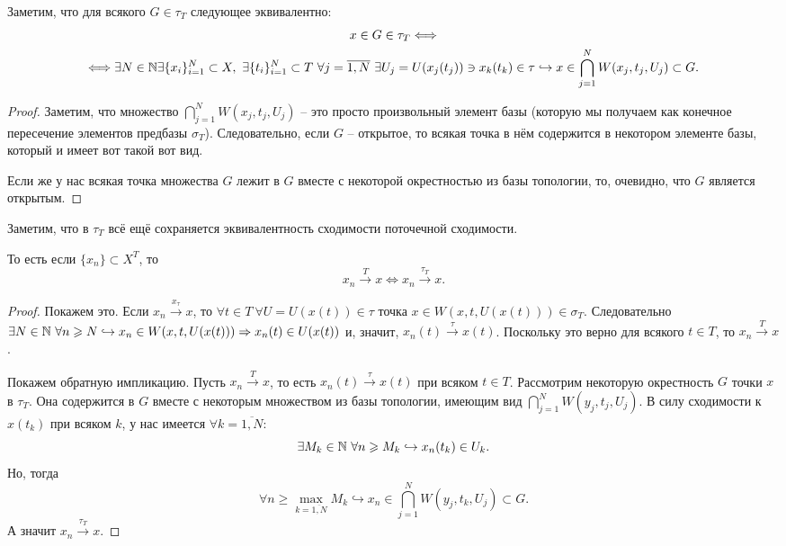 \begin{proposition}
    Заметим, что для всякого $G \in \tau_T$ следующее эквивалентно:
    \begin{multline*}
        x \in G \in \tau_T \Longleftrightarrow \\
        \Longleftrightarrow \exists N \in \mathbb{N} \exists \{x_i\}_{i = 1}^{N} \subset X, \ \exists \{t_i\}_{i = 1}^{N} \subset T \ \forall j = \overline{1, N} \ \exists U_j = U(x_j(t_j)) \ni x_k(t_k) \in \tau \hookrightarrow x \in \bigcap_{j = 1}^{N} W(x_j, t_j, U_j) \subset G.
    \end{multline*}
\end{proposition}
\begin{proof}
    Заметим, что множество $\bigcap_{j = 1}^{N} W(x_j, t_j, U_j)$ -- это просто произвольный элемент базы (которую мы получаем как конечное пересечение элементов предбазы $\sigma_T$).
    Следовательно, если $G$ -- открытое, то всякая точка в нём содержится в некотором элементе базы, который и имеет вот такой вот вид.

    Если же у нас всякая точка множества $G$ лежит в $G$ вместе с некоторой окрестностью из базы топологии, то, очевидно, что $G$ является открытым.
\end{proof}
\begin{note}
    Заметим, что в $\tau_T$ всё ещё сохраняется эквивалентность сходимости поточечной сходимости.
    \begin{proposition}
        То есть если $\{x_n\} \subset X^T$, то
        \[
            x_n \xrightarrow{T} x \Longleftrightarrow x_n \xrightarrow{\tau_T} x.
        \]
    \end{proposition}
    \begin{proof}
        Покажем это.
        Если $x_n \xrightarrow{x_\tau} x$, то $\forall t \in T \ \forall U = U(x(t)) \in \tau$ точка $x \in W(x, t, U(x(t))) \in \sigma_T$.
        Следовательно $\exists N \in \mathbb{N} \ \forall n \geqslant N \hookrightarrow x_n \in W(x, t, U(x(t))) \Rightarrow x_n(t) \in U(x(t))$ и, значит, $x_n(t) \xrightarrow{\tau} x(t)$.
        Поскольку это верно для всякого $t \in T$, то $x_n \xrightarrow{T} x$.

        Покажем обратную импликацию.
        Пусть $x_n \xrightarrow{T} x$, то есть $x_n(t) \xrightarrow{\tau} x(t)$ при всяком $t \in T$.
        Рассмотрим некоторую окрестность $G$ точки $x$ в $\tau_T$.
        Она содержится в $G$ вместе с некоторым множеством из базы топологии, имеющим вид $\bigcap_{j = 1}^{N} W(y_j, t_j, U_j)$.
        В силу сходимости к $x(t_k)$ при всяком $k$, у нас имеется $\forall k = \overline{1, N}\colon$
        \[
            \exists M_k \in \mathbb{N} \ \forall n \geqslant M_k \hookrightarrow x_n(t_k) \in U_k.
        \]
        Но, тогда
        \[
            \forall n \geq \max_{k = \overline{1, N}} M_k \hookrightarrow x_n \in \bigcap_{j = 1}^{N} W(y_j, t_k ,U_j) \subset G.
        \]
        А значит $x_n \xrightarrow{\tau_T} x$.
    \end{proof}
\end{note}